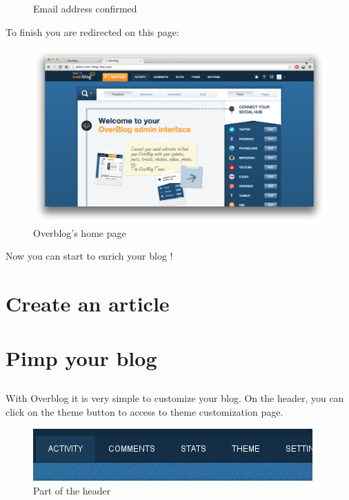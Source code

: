 \documentclass[a4paper,10pt]{article}
\begin{document}
\begin{enumerate}
\begin{figure}[H]
    \caption{Email address confirmed}
\end{figure}
To finish you are redirected on this page:
\begin{figure}[H]
    \center
	\includegraphics[width=13cm]{Images/overblogPage.png}
    \caption{Overblog's home page}
\end{figure}
Now you can start to enrich your blog !
\end{enumerate}


\newpage
\section{Create an article}



\newpage
\section{Pimp your blog}
\subsection{}
With Overblog it is very simple to customize your blog. On the header, you can click on the theme button to access to theme customization page.
\begin{figure}[htpb]
 \centering
 \includegraphics[scale=0.43]{Images/HeaderBar.png}
 \caption{Part of the header}
 \label{customHeader}
\end{figure}
\end{document}
